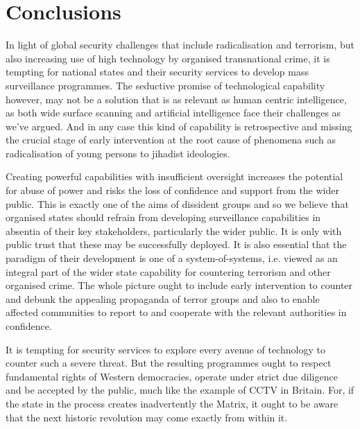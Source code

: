 \documentclass{llncs}
\begin{document}
\section{Conclusions}
\label{sec:Conclusions}
In light of global security challenges that include radicalisation and terrorism, but also increasing use of high technology by organised transnational crime, it is tempting for national states and their security services to develop mass surveillance programmes. The seductive promise of technological capability however, may not be a solution that is as relevant as human centric intelligence, as both wide surface scanning and artificial intelligence face their challenges as we've argued. And in any case this kind of capability is retrospective and missing the crucial stage of early intervention at the root cause of phenomena such as radicalisation of young persons to jihadist ideologies.

Creating powerful capabilities with insufficient oversight increases the potential for abuse of power and risks the loss of confidence and support from the wider public. This is exactly one of the aims of dissident groups and so we believe that organised states should refrain from developing surveillance capabilities in absentia of their key stakeholders, particularly the wider public. It is only with public trust that these may be successfully deployed. It is also essential that the paradigm of their development is one of a system-of-systems, i.e. viewed as an integral part of the wider state capability for countering terrorism and other organised crime. The whole picture ought to include early intervention to counter and debunk the appealing propaganda of terror groups and also to enable affected communities to report to and cooperate with the relevant authorities in confidence.

It is tempting for security services to explore every avenue of technology to counter such a severe threat. But the resulting programmes ought to respect fundamental rights of Western democracies, operate under strict due diligence and be accepted by the public, much like the example of CCTV in Britain. For, if the state in the process creates inadvertently the Matrix, it ought to be aware that the next historic revolution may come exactly from within it.
\end{document}
